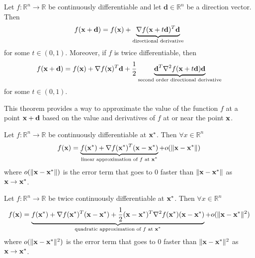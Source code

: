 \begin{theorem}
  Let $f: \mathbb R^n \to \mathbb R$ be continuously differentiable and let $\textbf{d} \in \mathbb R^n$ be a direction vector. Then
  $$f(\textbf{x} + \textbf{d}) = f(\textbf{x}) + \underbrace{\nabla f(\textbf{x} + t\textbf{d})^T \textbf{d}}_{\text{directional derivative}}$$ for some $t \in (0,1)$. Moreover, if $f$ is twice differentiable, then
  $$f(\textbf{x} + \textbf{d}) = f(\textbf{x}) + \nabla f(\textbf{x})^T\textbf{d} + \frac{1}{2} \underbrace{\textbf{d}^T \nabla^2 f(\textbf{x} + t\textbf{d}) \textbf{d}}_{\text{second order directional derivative}}$$ for some $t \in (0,1)$.

  \bigskip
  This theorem provides a way to approximate the value of the function $f$ at a point $\textbf{x} + \textbf{d}$ based on the value and derivatives of $f$ at or near the point $\textbf{x}$.
\end{theorem}
\begin{theorem}
  Let $f: \mathbb R^n \to \mathbb R$ be continuously differentiable at $\textbf{x}^*$. Then $\forall x \in \mathbb R^n$
  $$f(\textbf{x}) = \underbrace{f(\textbf{x}^*) + \nabla f(\textbf{x}^*)^T (\textbf{x} - \textbf{x}^*)}_{\text{linear approximation of $f$ at $\textbf{x}^*$}} + o(\| \textbf{x} - \textbf{x}^* \|)$$
  where $o(\| \textbf{x} - \textbf{x}^* \|)$ is the error term that goes to 0 faster than $\| \textbf{x} - \textbf{x}^* \|$ as $\textbf{x} \to \textbf{x}^*$.

  Let $f: \mathbb R^n \to \mathbb R$ be twice continuously differentiable at $\textbf{x}^*$. Then $\forall x \in \mathbb R^n$
  $$f(\textbf{x}) = \underbrace{f(\textbf{x}^*) + \nabla f(\textbf{x}^*)^T (\textbf{x} - \textbf{x}^*) + \frac{1}{2} (\textbf{x} - \textbf{x}^*)^T \nabla^2 f(\textbf{x}^*) (\textbf{x} - \textbf{x}^*)}_{\text{quadratic approximation of $f$ at $\textbf{x}^*$}} + o(\| \textbf{x} - \textbf{x}^* \|^2)$$
  where $o(\| \textbf{x} - \textbf{x}^* \|^2)$ is the error term that goes to 0 faster than $\| \textbf{x} - \textbf{x}^* \|^2$ as $\textbf{x} \to \textbf{x}^*$.
\end{theorem}


